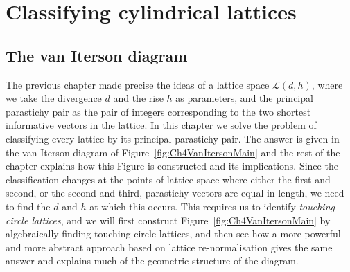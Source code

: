 

\chapter{Classifying cylindrical lattices}
\label{ch:classifying}
\section{The van Iterson diagram}
The previous chapter made precise the ideas  of a lattice space $\mathcal{L}(d,h)$, where we take the divergence $d$ and the rise $h$ as parameters, and the principal parastichy pair as the pair of integers corresponding to the two shortest informative vectors in the lattice. In this chapter  we solve the problem of classifying every lattice by its principal parastichy pair.
The answer is given in the van Iterson diagram of Figure~\ref{fig:Ch4VanItersonMain} and the rest of the chapter explains how this Figure is constructed and its implications. 
 Since the classification changes at the points of lattice space where either the first and second, or the second and third, parastichy vectors are equal in length, we need to find the $d$ and $h$ at which this occurs. This requires us to identify \emph{touching-circle lattices}, and we will first construct Figure~\ref{fig:Ch4VanItersonMain} by algebraically finding touching-circle lattices, and then see how a more powerful and more abstract approach based on lattice re-normalisation gives the same answer and explains much of the geometric structure of the diagram. 
 
 

\clearpage

